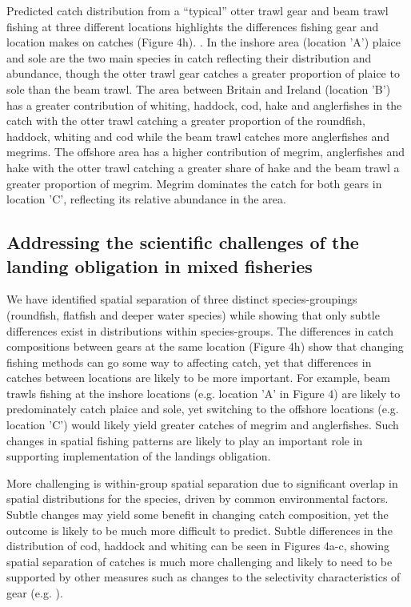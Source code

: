 \documentclass{nature}
\begin{document}
Predicted catch distribution from a ``typical'' otter trawl gear and beam trawl
fishing at three different locations highlights the differences fishing gear
and location makes on catches (Figure 4h). . In the inshore area (location 'A') plaice and sole are
the two main species in catch reflecting their distribution and abundance,
though the otter trawl gear catches a greater proportion of plaice to sole than
the beam trawl.  The area between Britain and Ireland (location 'B') has a
greater contribution of whiting, haddock, cod, hake and anglerfishes in the
catch with the otter trawl catching a greater proportion of the roundfish,
haddock, whiting and cod while the beam trawl catches more anglerfishes and
megrims. The offshore area has a higher contribution of megrim, anglerfishes
and hake with the otter trawl catching a greater share of hake and the beam
trawl a greater proportion of megrim. Megrim dominates the catch for both gears
in location 'C', reflecting its relative abundance in the area.  

\subsection{Addressing the scientific challenges of the landing obligation in
	mixed fisheries}  We have
identified spatial separation of three distinct species-groupings (roundfish,
flatfish and deeper water species) while showing that only subtle differences
exist in distributions within species-groups. The differences in catch
compositions between gears at the same location (Figure 4h) show that changing
fishing methods can go some way to affecting catch, yet that differences in
catches between locations are likely to be more important. For example, beam
trawls fishing at the inshore locations (e.g. location 'A' in Figure 4) are
likely to predominately catch plaice and sole, yet switching to the offshore
locations (e.g. location 'C') would likely yield greater catches of megrim and
anglerfishes.  Such changes in spatial fishing patterns are likely to play an
important role in supporting implementation of the landings obligation.

More challenging is within-group spatial separation due to significant overlap
in spatial distributions for the species, driven by common environmental
factors. Subtle changes may yield some benefit in changing catch composition,
yet the outcome is likely to be much more difficult to predict. 
Subtle differences in the distribution of cod, haddock and whiting can be seen
in Figures 4a-c, showing spatial separation of catches is much more challenging
and likely to need to be supported by other measures such as changes to the
selectivity characteristics of gear (e.g. \cite{Santos2016}). 
\end{document}
